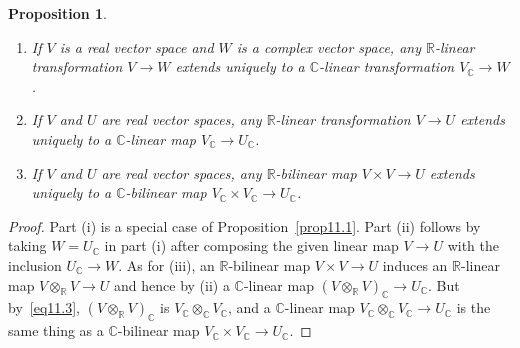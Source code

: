 \documentclass[12pt,reqno]{book}%
\newtheorem{proposition}{Proposition}[chapter]
\theoremstyle{definition}
\theoremstyle{remark}
\theoremstyle{theorem}
\theoremstyle{remark}
\begin{document}
\begin{proposition}\label{prop11.2}%
    \begin{enumerate}[label=(\roman*),font=\normalfont,before=\normalfont]
        \item If $V$ is a real vector space and $W$ is a complex vector space, any $\mathbb{R}$-linear transformation $V \to W$ extends uniquely to a $\mathbb{C}$-linear transformation $V_\mathbb{C} \to W$.
        \item If $V$ and $U$ are real vector spaces, any $\mathbb{R}$-linear transformation $V \to U$ extends uniquely to a $\mathbb{C}$-linear map $V_\mathbb{C} \to U_\mathbb{C}$.
        \item If $V$ and $U$ are real vector spaces, any $\mathbb{R}$-bilinear map $V \times V \to U$ extends uniquely to a $\mathbb{C}$-bilinear map $V_\mathbb{C} \times V_\mathbb{C} \to U_\mathbb{C}$.
    \end{enumerate}
\end{proposition}%
\begin{proof}%
    Part (i) is a special case of Proposition~\ref{prop11.1}.
    Part (ii) follows by taking $W = U_\mathbb{C}$ in part (i) after composing the given linear map $V \to U$ with the inclusion $U_\mathbb{C} \to W$.
    As for (iii), an $\mathbb{R}$-bilinear map $V \times V \to U$ induces an $\mathbb{R}$-linear map $V \otimes_{\mathbb{R}} V \to U$ and hence by (ii) a $\mathbb{C}$-linear map $(V \otimes_{\mathbb{R}} V)_\mathbb{C} \to U_\mathbb{C}$.
    But by~\eqref{eq11.3}, $(V \otimes_{\mathbb{R}} V)_\mathbb{C}$ is $V_\mathbb{C} \otimes_{\mathbb{C}} V_\mathbb{C}$, and a $\mathbb{C}$-linear map $V_\mathbb{C} \otimes_{\mathbb{C}} V_\mathbb{C} \to U_\mathbb{C}$ is the same thing as a $\mathbb{C}$-bilinear map $V_\mathbb{C} \times V_\mathbb{C} \to U_\mathbb{C}$.
\end{proof}%
\end{document}
